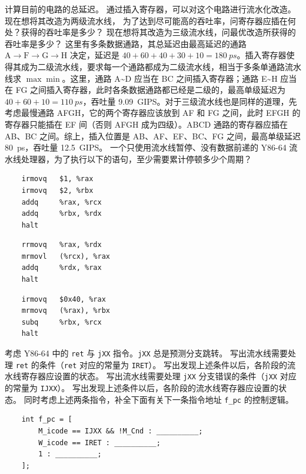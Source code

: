 \begin{problems}
\begin{figure}[H]
        \end{figure}
        \qn 计算目前的电路的总延迟。
        \qn 通过插入寄存器，可以对这个电路进行流水化改造。现在想将其改造为两级流水线， 为了达到尽可能高的吞吐率，问寄存器应插在何处？获得的吞吐率是多少？
        \qn 现在想将其改造为三级流水线，问最优改造所获得的吞吐率是多少？
        \sol 这里有多条数据通路，其总延迟由最高延迟的通路 $\mathrm A \to \mathrm F \to \mathrm G \to \mathrm H$ 决定，延迟是 $40+60+40+30+10 = \SI{180}{ps}$。插入寄存器使得其成为二级流水线，要求每一个通路都成为二级流水线，相当于多条单通路流水线求 $\max \min$。这里，通路 A\textasciitilde D 应当在 BC 之间插入寄存器；通路 E\textasciitilde H 应当在 FG 之间插入寄存器，此时各条数据通路都已经是二级的，最高单级延迟为 $40+60+10 = \SI{110}{ps}$，吞吐量 \SI{9.09}{GIPS}。对于三级流水线也是同样的道理，先考虑最慢通路 AFGH，它的两个寄存器应该放到 AF 和 FG 之间，此时 EFGH 的寄存器只能插在 EF 间（否则 AFGH 成为四级）。ABCD 通路的寄存器应插在 AB、BC 之间。综上，插入位置是 AB、AF、EF、BC、FG 之间，最高单级延迟 \SI{80}{ps}，吞吐量 \SI{12.5}{GIPS}。
        \pro 一个只使用流水线暂停、没有数据前递的 Y86-64 流水线处理器，为了执行以下的语句，至少需要累计停顿多少个周期？
            \qn
            \begin{verbatim}
    irmovq   $1, %rax
    irmovq   $2, %rbx
    addq     %rax, %rcx
    addq     %rbx, %rdx
    halt
            \end{verbatim}
            \qn
            \begin{verbatim}
    rrmovq   %rax, %rdx
    mrmovl   (%rcx), %rax
    addq     %rdx, %rax
    halt
            \end{verbatim}
            \qn
            \begin{verbatim}
    irmovq   $0x40, %rax
    mrmovq   (%rax), %rbx
    subq     %rbx, %rcx
    halt
            \end{verbatim}
        \pro 考虑 Y86-64 中的 \verb|ret| 与 \verb|jXX| 指令。\verb|jXX| 总是预测分支跳转。
            \qn 写出流水线需要处理 \verb|ret| 的条件（\verb|ret| 对应的常量为 \verb|IRET|）。
            \qn 写出发现上述条件以后，各阶段的流水线寄存器应设置的状态。
            \qn 写出流水线需要处理 \verb|jXX| 分支错误的条件（\verb|jXX| 对应的常量为 \verb|IJXX|）。
            \qn 写出发现上述条件以后，各阶段的流水线寄存器应设置的状态。
            \qn 同时考虑上述两条指令，补全下面有关下一条指令地址 \verb|f_pc| 的控制逻辑。
            \begin{verbatim}
    int f_pc = [
        M_icode == IJXX && !M_Cnd : __________;
        W_icode == IRET : __________;
        1 : __________;
    ];


\end{verbatim}
\end{problems}
